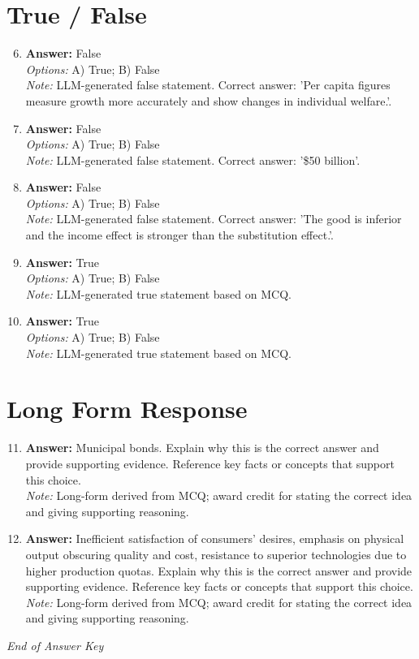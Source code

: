 \documentclass[12pt]{article}
\begin{document}
\section*{True / False}
\begin{enumerate}[label=\arabic*.]
\setcounter{enumi}{5}
\item \textbf{Answer:} False
\\ \textit{Options:} A) True; B) False
\\ \textit{Note:} LLM-generated false statement. Correct answer: 'Per capita figures measure growth more accurately and show changes in individual welfare.'.
\item \textbf{Answer:} False
\\ \textit{Options:} A) True; B) False
\\ \textit{Note:} LLM-generated false statement. Correct answer: '\$50 billion'.
\item \textbf{Answer:} False
\\ \textit{Options:} A) True; B) False
\\ \textit{Note:} LLM-generated false statement. Correct answer: 'The good is inferior and the income effect is stronger than the substitution effect.'.
\item \textbf{Answer:} True
\\ \textit{Options:} A) True; B) False
\\ \textit{Note:} LLM-generated true statement based on MCQ.
\item \textbf{Answer:} True
\\ \textit{Options:} A) True; B) False
\\ \textit{Note:} LLM-generated true statement based on MCQ.
\end{enumerate}

\section*{Long Form Response}
\begin{enumerate}[label=\arabic*.]
\setcounter{enumi}{10}
\item \textbf{Answer:} Municipal bonds. Explain why this is the correct answer and provide supporting evidence. Reference key facts or concepts that support this choice.
\\ \textit{Note:} Long-form derived from MCQ; award credit for stating the correct idea and giving supporting reasoning.
\item \textbf{Answer:} Inefficient satisfaction of consumers' desires, emphasis on physical output obscuring quality and cost, resistance to superior technologies due to higher production quotas. Explain why this is the correct answer and provide supporting evidence. Reference key facts or concepts that support this choice.
\\ \textit{Note:} Long-form derived from MCQ; award credit for stating the correct idea and giving supporting reasoning.
\end{enumerate}

\vfill
\noindent\textit{End of Answer Key}
\end{document}
